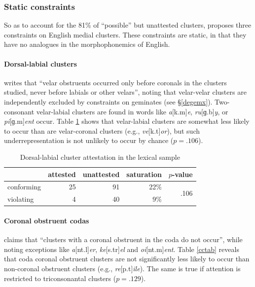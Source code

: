 \subsubsection{Static constraints}

So as to account for the 81\% of ``possible'' but unattested clusters, \citet{Pierrehumbert1994} proposes three constraints on English medial clusters. These constraints are static, in that they have no analogues in the morphophonemics of English.

\paragraph{Dorsal-labial clusters} 
\citet[173]{Pierrehumbert1994} writes that ``velar obstruents occurred only before coronals in the clusters studied, never before labials or other velars'', noting that velar-velar clusters are independently excluded by constraints on geminates (see \S\ref{degemx}). 
Two-consonant velar-labial clusters are found in words like \emph{a}[k.m]\emph{e}, \emph{ru}[ɡ.b]\emph{y}, or \emph{pi}[ɡ.m]\emph{ent} occur. 
Table \ref{dltab} shows that velar-labial clusters are somewhat less likely to occur than  are velar-coronal clusters (e.g., \emph{ve}[k.t]\emph{or}), but such underrepresentation is not unlikely to occur by chance ($p = .106$).

\begin{table}
\centering
\begin{tabular}{l rrrr}
\toprule
           & attested & unattested & saturation & $p$-value \\
\midrule
conforming & 25       & 91         & 22\%       & \multirow{2}{*}{.106} \\
violating  &  4       & 40         &  9\%       \\
\bottomrule
\end{tabular}
\caption{Dorsal-labial cluster attestation in the lexical sample}
\label{dltab}
\end{table}

\paragraph{Coronal obstruent codas} 
\citet[175]{Pierrehumbert1994} claims that ``clusters with a coronal obstruent in the coda do not occur'', while noting exceptions like \emph{a}[nt.l]\emph{er}, \emph{ke}[s.tr]\emph{el} and \emph{oi}[nt.m]\emph{ent}. 
Table \ref{cctab} reveals that coda coronal obstruent clusters are not significantly less likely to occur than non-coronal obstruent clusters (e.g., \emph{re}[p.t]\emph{ile}). 
The same is true if attention is restricted to triconsonantal clusters ($p = .129$).

